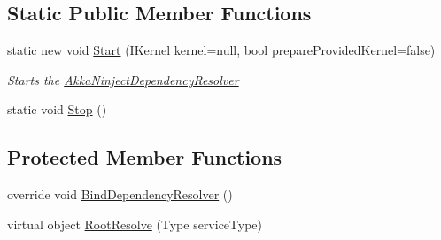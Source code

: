 \subsection*{Static Public Member Functions}
\begin{DoxyCompactItemize}
\item 
static new void \hyperlink{classCqrs_1_1Ninject_1_1Akka_1_1AkkaNinjectDependencyResolver_afedf5f178be776a0f89d7d12c63326c7_afedf5f178be776a0f89d7d12c63326c7}{Start} (I\+Kernel kernel=null, bool prepare\+Provided\+Kernel=false)
\begin{DoxyCompactList}\small\item\em Starts the \hyperlink{classCqrs_1_1Ninject_1_1Akka_1_1AkkaNinjectDependencyResolver}{Akka\+Ninject\+Dependency\+Resolver} \end{DoxyCompactList}\item 
static void \hyperlink{classCqrs_1_1Ninject_1_1Akka_1_1AkkaNinjectDependencyResolver_a605f605b38b49b8d0e00695983f85bf6_a605f605b38b49b8d0e00695983f85bf6}{Stop} ()
\end{DoxyCompactItemize}
\subsection*{Protected Member Functions}
\begin{DoxyCompactItemize}
\item 
override void \hyperlink{classCqrs_1_1Ninject_1_1Akka_1_1AkkaNinjectDependencyResolver_ab7ba3c0a331d115073b5118673984507_ab7ba3c0a331d115073b5118673984507}{Bind\+Dependency\+Resolver} ()
\item 
virtual object \hyperlink{classCqrs_1_1Ninject_1_1Akka_1_1AkkaNinjectDependencyResolver_a01f8088b8081ccaad65c1c6be36f7b65_a01f8088b8081ccaad65c1c6be36f7b65}{Root\+Resolve} (Type service\+Type)
\end{DoxyCompactItemize}
